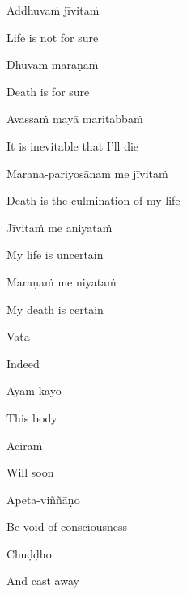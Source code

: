 \suttaRef{[Dhp 277-279]}

Addhuvaṁ jīvitaṁ

\begin{english}
  Life is not for sure
\end{english}

Dhuvaṁ maraṇaṁ

\begin{english}
  Death is for sure
\end{english}

Avassaṁ mayā maritabbaṁ

\begin{english}
  It is inevitable that I'll die
\end{english}

Maraṇa-pariyosānaṁ me jīvitaṁ

\begin{english}
  Death is the culmination of my life
\end{english}

Jīvitaṁ me aniyataṁ

\begin{english}
  My life is uncertain
\end{english}

Maraṇaṁ me niyataṁ

\begin{english}
  My death is certain
\end{english}

\suttaRef{[Dhp A]}

\clearpage

Vata

\begin{english}
  Indeed
\end{english}

Ayaṁ kāyo

\begin{english}
  This body
\end{english}

Aciraṁ

\begin{english}
  Will soon
\end{english}

Apeta-viññāṇo

\begin{english}
  Be void of consciousness
\end{english}

Chuḍḍho

\begin{english}
  And cast away
\end{english}

